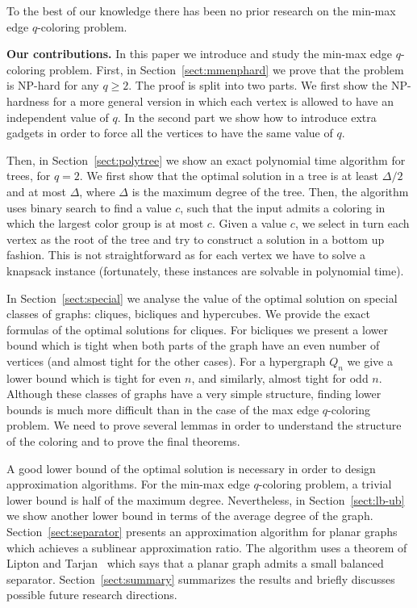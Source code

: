 \documentclass[runningheads, a4paper]{llncs}
\begin{document}
To the best of our knowledge there has been no prior research on the min-max edge $q$-coloring problem.



\textbf{Our contributions.}
In this paper we introduce and study the min-max edge $q$-coloring problem. First,  in Section~\ref{sect:mmenphard} we prove that the problem is NP-hard for any $q \ge 2$. The proof is split into two parts. We first show the NP-hardness for a more general version in which each vertex is allowed to have an independent value of $q$. In the second part we show how to introduce extra gadgets in order to force all the vertices to have the same value of $q$. 

Then, in Section~\ref{sect:polytree} we show an exact polynomial time algorithm for trees, for $q=2$. We first show that the optimal solution in a tree is at least $\Delta / 2$ and at most $\Delta$, where $\Delta$ is the maximum degree of the tree. Then, the algorithm uses binary search to find a value $c$, such that the input admits a coloring in which the largest color group is at most $c$. Given a value $c$, we select in turn each vertex as the root of the tree and try to construct a solution in a bottom up fashion. This is not straightforward as for each vertex we have to solve a knapsack instance (fortunately, these instances are solvable in polynomial time).

In Section~\ref{sect:special} we analyse the value of the optimal solution on special classes of graphs: cliques, bicliques and hypercubes. We provide the exact formulas of the optimal solutions for cliques. For bicliques we present a lower bound which is tight when both parts of the graph have an even number of vertices (and almost tight for the other cases). For a hypergraph $Q_n$ we give a lower bound which is tight for even $n$, and similarly, almost tight for odd $n$. Although these classes of graphs have a very simple structure, finding lower bounds is much more difficult than in the case of the max edge $q$-coloring problem. We need to prove several lemmas in order to understand the structure of the coloring and to prove the final theorems.

A good lower bound of the optimal solution is necessary in order to design approximation algorithms. For the min-max edge $q$-coloring problem, a trivial lower bound is half of the maximum degree. Nevertheless, in Section~\ref{sect:lb-ub} we show another lower bound in terms of the average degree of the graph. Section~\ref{sect:separator}  presents an approximation algorithm for planar graphs which achieves a sublinear approximation ratio. The algorithm uses a theorem of Lipton and Tarjan~\cite{Lipton1980} which says that a planar graph admits a small balanced separator.
Section~\ref{sect:summary} summarizes the results and briefly discusses possible future research directions.
\end{document}
